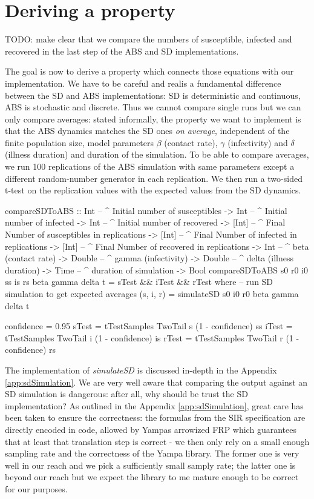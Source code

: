 \section{Deriving a property}
TODO: make clear that we compare the numbers of susceptible, infected and recovered in the last step of the ABS and SD implementations.

The goal is now to derive a property which connects those equations with our implementation. We have to be careful and realis a fundamental difference between the SD and ABS implementations: SD is deterministic and continuous, ABS is stochastic and discrete. Thus we cannot compare single runs but we can only compare averages: stated informally, the property we want to implement is that the ABS dynamics matches the SD ones \textit{on average}, independent of the finite population size, model parameters $\beta$ (contact rate), $\gamma$ (infectivity) and $\delta$ (illness duration) and duration of the simulation. To be able to compare averages, we run 100 replications of the ABS simulation with same parameters except a different random-number generator in each replication. We then run a two-sided t-test on the replication values with the expected values from the SD dynamics.

\begin{HaskellCode}
compareSDToABS :: Int     -- ^ Initial number of susceptibles
               -> Int     -- ^ Initial number of infected
               -> Int     -- ^ Initial number of recovered
               -> [Int]   -- ^ Final Number of susceptibles in replications
               -> [Int]   -- ^ Final Number of infected in replications
               -> [Int]   -- ^ Final Number of recovered in replications
               -> Int     -- ^ beta (contact rate)
               -> Double  -- ^ gamma (infectivity)
               -> Double  -- ^ delta (illness duration)
               -> Time    -- ^ duration of simulation
               -> Bool
compareSDToABS s0 r0 i0
               ss is rs
               beta gamma delta t = sTest && iTest && rTest
  where
    -- run SD simulation to get expected averages
    (s, i, r) = simulateSD s0 i0 r0 beta gamma delta t
    
    confidence = 0.95
    sTest = tTestSamples TwoTail s (1 - confidence) ss
    iTest = tTestSamples TwoTail i (1 - confidence) is
    rTest = tTestSamples TwoTail r (1 - confidence) rs
\end{HaskellCode}

The implementation of \textit{simulateSD} is discussed in-depth in the Appendix \ref{app:sdSimulation}. We are very well aware that comparing the output against an SD simulation is dangerous: after all, why should be trust the SD implementation? As outlined in the Appendix \ref{app:sdSimulation}, great care has been taken to ensure the correctness: the formulas from the SIR specification are directly encoded in code, allowed by Yampas arrowized FRP which guarantees that at least that translation step is correct - we then only rely on a small enough sampling rate and the correctness of the Yampa library. The former one is very well in our reach and we pick a sufficiently small samply rate; the latter one is beyond our reach but we expect the library to me mature enough to be correct for our purposes.

